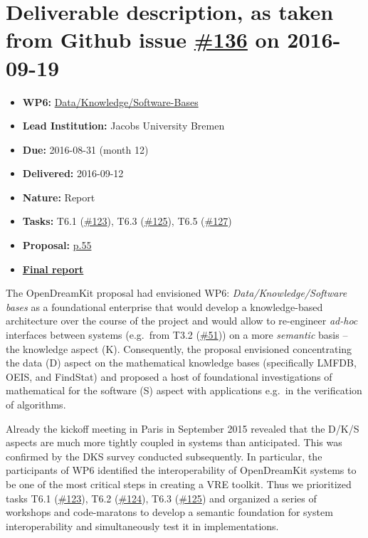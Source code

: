 \section*{\texorpdfstring{Deliverable description, as taken from Github
issue
\href{https://github.com/OpenDreamKit/OpenDreamKit/issues/136}{\#136} on
2016-09-19}{Deliverable description, as taken from Github issue \#136 on 2016-09-19}}\label{deliverable-description-as-taken-from-github-issue-136-on-2016-09-19}

\begin{itemize}
\tightlist
\item
  \textbf{WP6:}
  \href{https://github.com/OpenDreamKit/OpenDreamKit/tree/master/WP6}{Data/Knowledge/Software-Bases}
\item
  \textbf{Lead Institution:} Jacobs University Bremen
\item
  \textbf{Due:} 2016-08-31 (month 12)
\item
  \textbf{Delivered:} 2016-09-12
\item
  \textbf{Nature:} Report
\item
  \textbf{Tasks:} T6.1
  (\href{https://github.com/OpenDreamKit/OpenDreamKit/issues/123}{\#123}),
  T6.3
  (\href{https://github.com/OpenDreamKit/OpenDreamKit/issues/125}{\#125}),
  T6.5
  (\href{https://github.com/OpenDreamKit/OpenDreamKit/issues/127}{\#127})
\item
  \textbf{Proposal:}
  \href{https://github.com/OpenDreamKit/OpenDreamKit/raw/master/Proposal/proposal-www.pdf}{p.55}
\item
  \textbf{\href{https://github.com/OpenDreamKit/OpenDreamKit/raw/master/WP6/D6.2/report-final.pdf}{Final
  report}}
\end{itemize}

The OpenDreamKit proposal had envisioned WP6:
\emph{Data/Knowledge/Software bases} as a foundational enterprise that
would develop a knowledge-based architecture over the course of the
project and would allow to re-engineer \emph{ad-hoc} interfaces between
systems (e.g.~from T3.2
(\href{https://github.com/OpenDreamKit/OpenDreamKit/issues/51}{\#51}))
on a more \emph{semantic} basis -- the knowledge aspect (K).
Consequently, the proposal envisioned concentrating the data (D) aspect
on the mathematical knowledge bases (specifically LMFDB, OEIS, and
FindStat) and proposed a host of foundational investigations of
mathematical for the software (S) aspect with applications e.g.~in the
verification of algorithms.

Already the kickoff meeting in Paris in September 2015 revealed that the
D/K/S aspects are much more tightly coupled in systems than anticipated.
This was confirmed by the DKS survey conducted subsequently. In
particular, the participants of WP6 identified the interoperability of
OpenDreamKit systems to be one of the most critical steps in creating a
VRE toolkit. Thus we prioritized tasks T6.1
(\href{https://github.com/OpenDreamKit/OpenDreamKit/issues/123}{\#123}),
T6.2
(\href{https://github.com/OpenDreamKit/OpenDreamKit/issues/124}{\#124}),
T6.3
(\href{https://github.com/OpenDreamKit/OpenDreamKit/issues/125}{\#125})
and organized a series of workshops and code-maratons to develop a
semantic foundation for system interoperability and simultaneously test
it in implementations.

